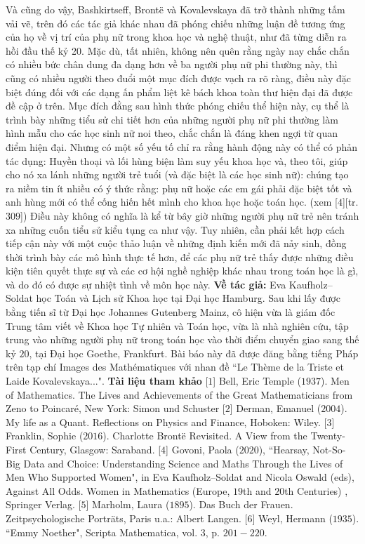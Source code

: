 \begin{multicols}{2}
	\vskip 0.1cm
	Và cũng do vậy, Bashkirtseff, Brontë và Kovalevskaya đã trở thành những tấm vải vẽ, trên đó các tác giả khác nhau đã phóng chiếu  những luận đề tương ứng của họ về vị trí của phụ nữ trong khoa học và nghệ thuật, như đã từng diễn ra hồi đầu thế kỷ 20. Mặc dù, tất nhiên, không nên quên rằng ngày nay chắc chắn có nhiều bức chân dung đa dạng hơn về ba người phụ nữ phi thường này, thì cũng có nhiều người theo đuổi một mục đích được vạch ra rõ ràng, điều này đặc biệt đúng đối với các dạng ấn phẩm liệt kê bách khoa toàn thư hiện đại đã được đề cập ở trên. Mục đích đằng sau hình thức phóng chiếu thể hiện này, cụ thể là trình bày những tiểu sử chi tiết hơn của những người phụ nữ phi thường  làm hình mẫu cho các học sinh nữ noi theo, chắc chắn là đáng khen ngợi từ quan điểm hiện đại. Nhưng có một số yếu tố chỉ ra rằng hành động này có thể có phản tác dụng:
	\vskip 0.1cm
	Huyền thoại và lối hùng biện làm suy yếu khoa học và, theo tôi, giúp cho nó xa lánh những người trẻ tuổi (và đặc biệt là các học sinh nữ): chúng tạo ra niềm tin ít nhiều có ý thức rằng: phụ nữ hoặc các em gái phải đặc biệt tốt và anh hùng mới có thể cống hiến hết mình cho khoa học hoặc toán học. (xem [$4$][tr. $309$])
	\vskip 0.1cm
	Điều này không có nghĩa là kể từ bây giờ những người phụ nữ trẻ nên tránh xa những cuốn tiểu sử kiểu tụng ca như vậy. Tuy nhiên, cần phải kết hợp cách tiếp cận này với một cuộc thảo luận về những định kiến mới đã nảy sinh, đồng thời trình bày các mô hình thực tế hơn, để các phụ nữ trẻ thấy được những điều kiện tiên quyết thực sự và các cơ hội nghề nghiệp khác nhau trong toán học là gì, và do đó có được sự nhiệt tình về môn học này.
	\vskip 0.1cm
	\textbf{\color{lichsutoanhoc}Về tác giả:} Eva Kaufholz--Soldat học Toán và Lịch sử Khoa học tại Đại học Hamburg. Sau khi lấy được bằng tiến sĩ từ Đại học Johannes Gutenberg Mainz, cô hiện vừa là giám đốc Trung tâm viết về Khoa học Tự nhiên và Toán học, vừa là nhà nghiên cứu, tập trung vào những người phụ nữ trong toán học vào thời điểm chuyển giao sang thế kỷ $20$, tại Đại học Goethe, Frankfurt. Bài báo này đã được đăng bằng tiếng Pháp trên tạp chí Images des Mathématiques với nhan đề ``Le Thème de la Triste et Laide Kovalevskaya...".
	\vskip 0.1cm
	\textbf{\color{lichsutoanhoc}Tài liệu tham khảo}
	\vskip 0.1cm
	[$1$] Bell, Eric Temple ($1937$). Men of Mathematics. The Lives and Achievements of the Great Mathematicians from Zeno to Poincaré, New York: Simon und Schuster
	\vskip 0.1cm
	[$2$] Derman, Emanuel ($2004$). My life as a Quant. Reflections on Physics and Finance, Hoboken: Wiley.
	\vskip 0.1cm
	[$3$] Franklin, Sophie ($2016$). Charlotte Brontë Revisited. A View from the Twenty-First Century, Glasgow: Saraband.
	\vskip 0.1cm
	[$4$] Govoni, Paola ($2020$), ``Hearsay, Not-So-Big Data and Choice: Understanding Science and Maths Through the Lives of Men Who Supported Women", in Eva Kaufholz--Soldat and Nicola Oswald (eds), Against All Odds. Women in Mathematics (Europe, $19$th and $20$th Centuries) , Springer Verlag.
	\vskip 0.1cm
	[$5$] Marholm, Laura ($1895$). Das Buch der Frauen. Zeitpsychologische Porträts, Paris u.a.: Albert Langen.
	\vskip 0.1cm
	[$6$] Weyl, Hermann ($1935$). ``Emmy Noether", Scripta Mathematica, vol. $3$, p. $201-220$.
\end{multicols}